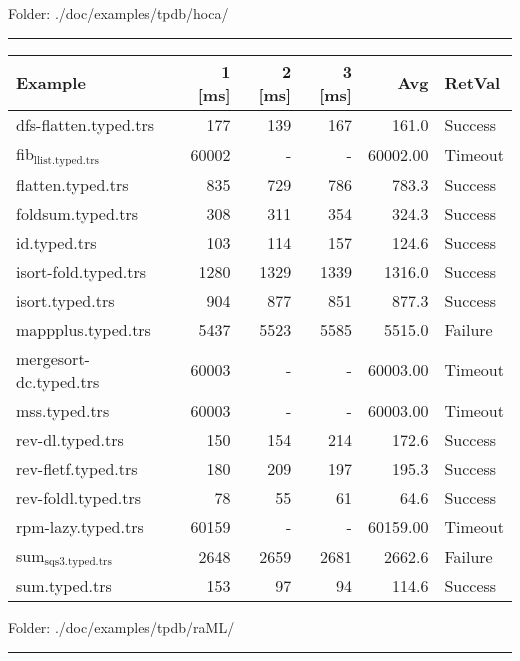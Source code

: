 \documentclass[11pt]{article}
\begin{document}
Folder: ./doc/examples/tpdb/hoca/

\rule{\linewidth}{0.5pt}

\begin{center}
\begin{tabular}{lrrrrl}
Example & 1 [ms] & 2 [ms] & 3 [ms] & Avg & RetVal\\
\hline
dfs-flatten.typed.trs & 177 & 139 & 167 & 161.0 & Success\\
fib\(_{\text{llist.typed.trs}}\) & 60002 & - & - & 60002.00 & Timeout\\
flatten.typed.trs & 835 & 729 & 786 & 783.3 & Success\\
foldsum.typed.trs & 308 & 311 & 354 & 324.3 & Success\\
id.typed.trs & 103 & 114 & 157 & 124.6 & Success\\
isort-fold.typed.trs & 1280 & 1329 & 1339 & 1316.0 & Success\\
isort.typed.trs & 904 & 877 & 851 & 877.3 & Success\\
mappplus.typed.trs & 5437 & 5523 & 5585 & 5515.0 & Failure\\
mergesort-dc.typed.trs & 60003 & - & - & 60003.00 & Timeout\\
mss.typed.trs & 60003 & - & - & 60003.00 & Timeout\\
rev-dl.typed.trs & 150 & 154 & 214 & 172.6 & Success\\
rev-fletf.typed.trs & 180 & 209 & 197 & 195.3 & Success\\
rev-foldl.typed.trs & 78 & 55 & 61 & 64.6 & Success\\
rpm-lazy.typed.trs & 60159 & - & - & 60159.00 & Timeout\\
sum\(_{\text{sqs3.typed.trs}}\) & 2648 & 2659 & 2681 & 2662.6 & Failure\\
sum.typed.trs & 153 & 97 & 94 & 114.6 & Success\\
\end{tabular}

\end{center}


Folder: ./doc/examples/tpdb/raML/

\rule{\linewidth}{0.5pt}
\end{document}
